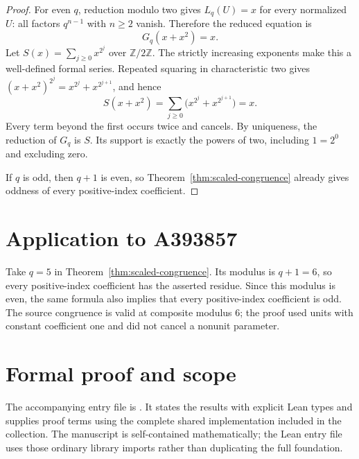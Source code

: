 \documentclass[11pt,a4paper]{article}
\theoremstyle{remark}\newtheorem{remark}[theorem]{Remark}
\newcommand{\Z}{\mathbb Z}
\begin{document}
\begin{proof}
For even $q$, reduction modulo two gives $L_q(U)=x$ for every
normalized $U$: all factors $q^{n-1}$ with $n\ge2$ vanish.
Therefore the reduced equation is
\[
G_q(x+x^2)=x.
\]
Let $S(x)=\sum_{j\ge0}x^{2^j}$ over $\Z/2\Z$.
The strictly increasing exponents make this a well-defined formal
series. Repeated squaring in characteristic two gives
$(x+x^2)^{2^j}=x^{2^j}+x^{2^{j+1}}$, and hence
\[
S(x+x^2)
=\sum_{j\ge0}\bigl(x^{2^j}+x^{2^{j+1}}\bigr)=x.
\]
Every term beyond the first occurs twice and cancels. By uniqueness,
the reduction of $G_q$ is $S$. Its support is exactly the powers
of two, including $1=2^0$ and excluding zero.

If $q$ is odd, then $q+1$ is even, so
Theorem~\ref{thm:scaled-congruence} already gives oddness of every
positive-index coefficient.
\end{proof}


\section{Application to A393857}
Take $q=5$ in Theorem~\ref{thm:scaled-congruence}.
Its modulus is $q+1=6$, so every positive-index
coefficient has the asserted residue. Since this modulus is even, the same formula also implies
that every positive-index coefficient is odd. The source congruence
is valid at composite modulus 6; the proof used units
with constant coefficient one and did not cancel a nonunit parameter.

\section{Formal proof and scope}
The accompanying entry file is .
It states the results with explicit Lean types and supplies proof terms
using the complete shared implementation included in the collection.
The manuscript is self-contained mathematically; the Lean entry file uses
those ordinary library imports rather than duplicating the full foundation.
\end{document}
